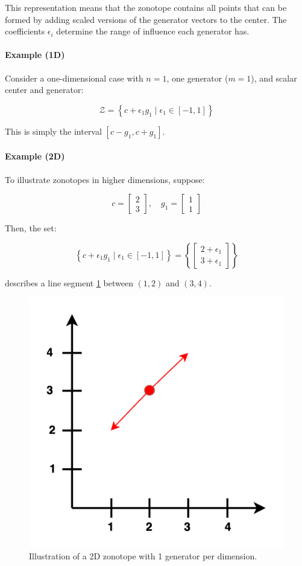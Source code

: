 \documentclass[oneside,11pt,dvipsnames]{book}
\begin{document}
This representation means that the zonotope contains all points that can be formed by adding scaled versions of the generator vectors to the center. The coefficients \(\epsilon_i\) determine the range of influence each generator has.

\paragraph{Example (1D)} Consider a one-dimensional case with \(n = 1\), one generator (\(m = 1\)), and scalar center and generator:

\[
\mathcal{Z} = \left\{c + \epsilon_1 g_1 \mid \epsilon_1 \in [-1, 1]\right\}
\]

This is simply the interval \([c - g_1, c + g_1]\).

\paragraph{Example (2D)} To illustrate zonotopes in higher dimensions, suppose:

\[
c = \begin{bmatrix}2 \\ 3\end{bmatrix}, \quad
g_1 = \begin{bmatrix}1 \\ 1\end{bmatrix}
\]

Then, the set:

\[
\left\{c + \epsilon_1 g_1 \mid \epsilon_1 \in [-1, 1]\right\}
= \left\{
\begin{bmatrix}2 + \epsilon_1 \\ 3 + \epsilon_1\end{bmatrix}
\right\}
\]

describes a line segment \ref{fig:2d1gzonotope-example} between \((1, 2)\) and \((3, 4)\).

\begin{figure}[h]
    \centering
    \includegraphics[width=0.5\linewidth]{figure/2d-zonotope.png}
    \caption{Illustration of a 2D zonotope with 1 generator per dimension.}
    \label{fig:2d1gzonotope-example}
\end{figure}
\end{document}
